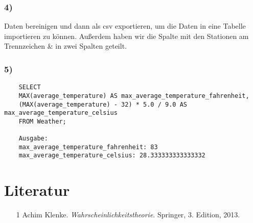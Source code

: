 \documentclass[12pt,a4paper]{article}
\begin{document}
\subsubsection{4)}
Daten bereinigen und dann als csv exportieren, um die Daten in eine Tabelle importieren zu können.
Außerdem haben wir die Spalte mit den Stationen am Trennzeichen \& in zwei Spalten geteilt.
\subsubsection{5)}
\begin{verbatim}
    SELECT 
    MAX(average_temperature) AS max_average_temperature_fahrenheit,
    (MAX(average_temperature) - 32) * 5.0 / 9.0 AS max_average_temperature_celsius
    FROM Weather;

    Ausgabe:
    max_average_temperature_fahrenheit: 83
    max_average_temperature_celsius: 28.333333333333332
\end{verbatim}
\newpage
\section*{Literatur}

\begin{itemize}
    \item[1] Achim Klenke. \textit{Wahrscheinlichkeitstheorie}. Springer, 3. Edition, 2013.
\end{itemize}
\end{document}

